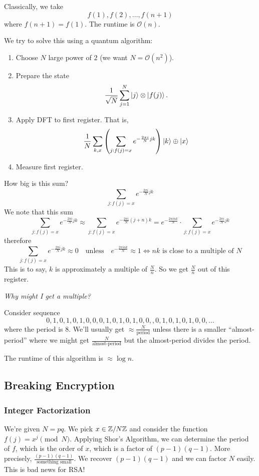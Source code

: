 Classically, we take
\[f(1), f(2), \dots, f(n+1)\]
where $f(n+1) = f(1)$. The runtime is $\mathcal{O}(n)$.

We try to solve this using a quantum algorithm:
\begin{enumerate}
    \item Choose $N$ large power of $2$ (we want $N = \mathcal{O}(n^2)$).
    \item Prepare the state
          \[\frac{1}{\sqrt{N}}\sum_{j=1}^N \Ket{j}\otimes \Ket{f(j)}.\]
    \item Apply DFT to first register. That is,
          \begin{align*}
              \frac{1}{N}\sum_{k, x} \left( \sum_{j: f(j) = x} e^{-\frac{2\pi i}{N}jk} \right)\Ket{k}\oplus\Ket{x}
          \end{align*}
    \item Measure first register.
\end{enumerate}

How big is this sum?
\[
    \sum_{j: f(j) = x} e^{-\frac{2\pi i}{N}jk}
\]
We note that this sum
\[
    \sum_{j: f(j) = x} e^{-\frac{2\pi i}{N}jk} \approx \sum_{j: f(j) = x} e^{-\frac{2\pi i}{N}(j+n)k} = e^{-\frac{2\pi ink}{N}}\cdot \sum_{j: f(j) = x} e^{-\frac{2\pi i}{N}jk}
\]
therefore
\[\sum_{j: f(j) = x} e^{-\frac{2\pi i}{N}jk} \approx 0\quad\text{unless}\quad e^{-\frac{2\pi ink}{N}}\approx 1 \iff nk\text{ is close to a multiple of $N$}\]
This is to say, $k$ is approximately a multiple of $\frac{N}{n}$. So we get $\frac{N}{n}$ out of this register.

\emph{Why might I get a multiple?}
\begin{example}
    Consider sequence
    \[\boxed{0, 1, 0, 1, 0, 1, 0, 0}, 0, 1, 0, 1, 0, 1, 0, 0, , 0, 1, 0, 1, 0, 1, 0, 0, \dots\]
    where the period is $8$. We'll usually get $\approx \frac{N}{\text{period}}$ unless there is a smaller ``almost-period'' where we might get $\frac{N}{\text{almost-period}}$ but the almost-period divides the period.
\end{example}

The runtime of this algorithm is $\approx \log n$.

\subsection{Breaking Encryption}
\subsubsection{Integer Factorization}
We're given $N = pq$. We pick $x\in \mathbb Z/N\mathbb Z$ and consider the function $f(j) = x^j\pmod{N}$. Applying Shor's Algorithm, we can determine the period of $f$, which is the order of $x$, which is a factor of $(p-1)(q-1)$. More precisely, $\frac{(p-1)(q-1)}{\text{something small}}$. We recover $(p-1)(q-1)$ and we can factor $N$ easily. This is bad news for RSA!

